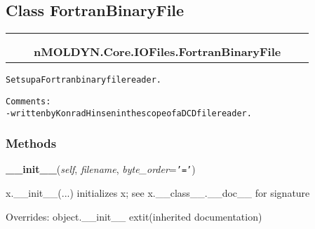 
\subsection{Class FortranBinaryFile}

    \label{nMOLDYN:Core:IOFiles:FortranBinaryFile}
\begin{tabular}{cccccc}
\multicolumn{2}{r}{\settowidth{\BCL}{object}\multirow{2}{\BCL}{object}}
&&
  \\\cline{3-3}
  &&\multicolumn{1}{c|}{}
&&
  \\
&&\multicolumn{2}{l}{\textbf{nMOLDYN.Core.IOFiles.FortranBinaryFile}}
\end{tabular}

\begin{alltt}
Sets up a Fortran binary file reader. 

Comments:
    -written by Konrad Hinsen in the scope of a DCD file reader.
\end{alltt}



  \subsubsection{Methods}

    \vspace{0.5ex}

\hspace{.8\funcindent}\begin{boxedminipage}{\funcwidth}

    \raggedright \textbf{\_\_init\_\_}(\textit{self}, \textit{filename}, \textit{byte\_order}={\tt '='})

\setlength{\parskip}{2ex}
    x.\_\_init\_\_(...) initializes x; see x.\_\_class\_\_.\_\_doc\_\_ for 
    signature

\setlength{\parskip}{1ex}
      Overrides: object.\_\_init\_\_ 	extit{(inherited documentation)}

    \end{boxedminipage}

